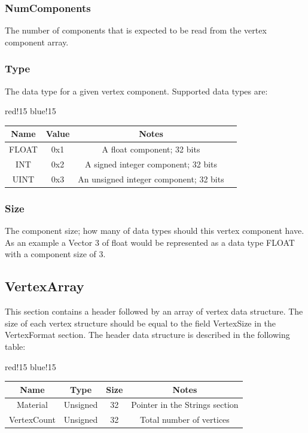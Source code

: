 \subsubsection{NumComponents}
The number of components that is expected to be read from the vertex component array.

\subsubsection{Type}
The data type for a given vertex component. Supported data types are:
\begin{center}
    {
        {red!15}
        {blue!15}
        \begin{tabular}{|c|c|c|c|}
            \hline
            \textbf{Name} & \textbf{Value} & \textbf{Notes} \\

            \hline\hline
            FLOAT & 0x1 & A float component; 32 bits \\
            INT & 0x2 & A signed integer component; 32 bits \\
            UINT & 0x3 & An unsigned integer component; 32 bits \\
            \hline
        \end{tabular}
    }
\end{center}

\subsubsection{Size}
The component size; how many of data types should this vertex component have. As an example a Vector 3 of float would be represented as a data type FLOAT with a component size of 3.

\subsection{VertexArray}
This section contains a header followed by an array of vertex data structure. The size of each vertex structure should be equal to the field VertexSize in the VertexFormat section.\newline
The header data structure is described in the following table:
\begin{center}
    {
        {red!15}
        {blue!15}
        \begin{tabular}{|c|c|c|c|}
            \hline
            \textbf{Name} & \textbf{Type} & \textbf{Size} & \textbf{Notes} \\
    
            \hline\hline
            Material & Unsigned & 32 & Pointer in the Strings section \\
            VertexCount & Unsigned & 32 & Total number of vertices \\
            \hline
        \end{tabular}
    }
\end{center}

